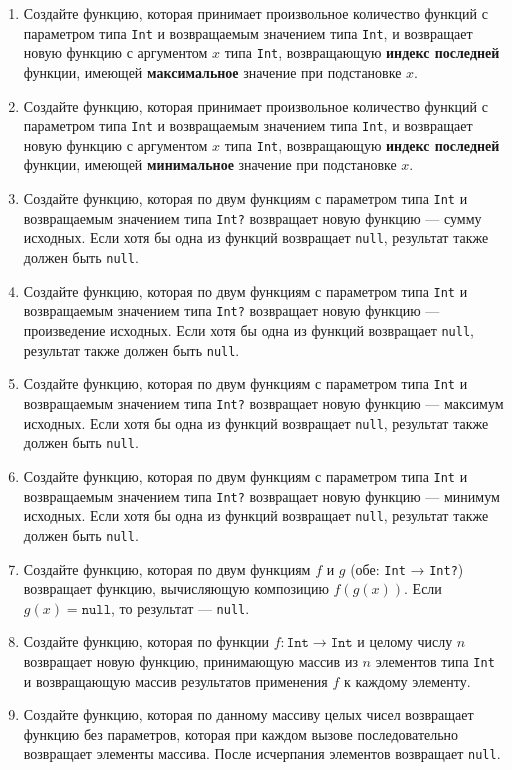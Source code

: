 \begin{enumerate}
    \item Создайте функцию, которая принимает произвольное количество функций с параметром типа \texttt{Int} и возвращаемым значением типа \texttt{Int}, и возвращает новую функцию с аргументом \( x \) типа \texttt{Int}, возвращающую \textbf{индекс последней} функции, имеющей \textbf{максимальное} значение при подстановке \( x \).
    \item Создайте функцию, которая принимает произвольное количество функций с параметром типа \texttt{Int} и возвращаемым значением типа \texttt{Int}, и возвращает новую функцию с аргументом \( x \) типа \texttt{Int}, возвращающую \textbf{индекс последней} функции, имеющей \textbf{минимальное} значение при подстановке \( x \).
    \item Создайте функцию, которая по двум функциям с параметром типа \texttt{Int} и возвращаемым значением типа \texttt{Int?} возвращает новую функцию — сумму исходных. Если хотя бы одна из функций возвращает \texttt{null}, результат также должен быть \texttt{null}.
    \item Создайте функцию, которая по двум функциям с параметром типа \texttt{Int} и возвращаемым значением типа \texttt{Int?} возвращает новую функцию — произведение исходных. Если хотя бы одна из функций возвращает \texttt{null}, результат также должен быть \texttt{null}.
    \item Создайте функцию, которая по двум функциям с параметром типа \texttt{Int} и возвращаемым значением типа \texttt{Int?} возвращает новую функцию — максимум исходных. Если хотя бы одна из функций возвращает \texttt{null}, результат также должен быть \texttt{null}.
    \item Создайте функцию, которая по двум функциям с параметром типа \texttt{Int} и возвращаемым значением типа \texttt{Int?} возвращает новую функцию — минимум исходных. Если хотя бы одна из функций возвращает \texttt{null}, результат также должен быть \texttt{null}.
    \item Создайте функцию, которая по двум функциям \( f \) и \( g \) (обе: \texttt{Int} → \texttt{Int?}) возвращает функцию, вычисляющую композицию \( f(g(x)) \). Если \( g(x) = \texttt{null} \), то результат — \texttt{null}.
    \item Создайте функцию, которая по функции \( f: \texttt{Int} \to \texttt{Int} \) и целому числу \( n \) возвращает новую функцию, принимающую массив из \( n \) элементов типа \texttt{Int} и возвращающую массив результатов применения \( f \) к каждому элементу.
    \item Создайте функцию, которая по данному массиву целых чисел возвращает функцию без параметров, которая при каждом вызове последовательно возвращает элементы массива. После исчерпания элементов возвращает \texttt{null}.

\end{enumerate}
